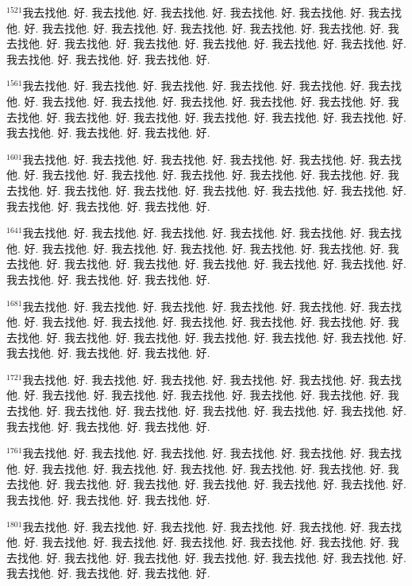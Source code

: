 \documentclass{book}
\begin{document}
$^{1521}$我去找他.
好.
我去找他.
好.
我去找他.
好.
我去找他.
好.
我去找他.
好.
我去找他.
好.
我去找他.
好.
我去找他.
好.
我去找他.
好.
我去找他.
好.
我去找他.
好.
我去找他.
好.
我去找他.
好.
我去找他.
好.
我去找他.
好.
我去找他.
好.
我去找他.
好.
我去找他.
好.
我去找他.
好.
我去找他.
好.

$^{1561}$我去找他.
好.
我去找他.
好.
我去找他.
好.
我去找他.
好.
我去找他.
好.
我去找他.
好.
我去找他.
好.
我去找他.
好.
我去找他.
好.
我去找他.
好.
我去找他.
好.
我去找他.
好.
我去找他.
好.
我去找他.
好.
我去找他.
好.
我去找他.
好.
我去找他.
好.
我去找他.
好.
我去找他.
好.
我去找他.
好.

$^{1601}$我去找他.
好.
我去找他.
好.
我去找他.
好.
我去找他.
好.
我去找他.
好.
我去找他.
好.
我去找他.
好.
我去找他.
好.
我去找他.
好.
我去找他.
好.
我去找他.
好.
我去找他.
好.
我去找他.
好.
我去找他.
好.
我去找他.
好.
我去找他.
好.
我去找他.
好.
我去找他.
好.
我去找他.
好.
我去找他.
好.

$^{1641}$我去找他.
好.
我去找他.
好.
我去找他.
好.
我去找他.
好.
我去找他.
好.
我去找他.
好.
我去找他.
好.
我去找他.
好.
我去找他.
好.
我去找他.
好.
我去找他.
好.
我去找他.
好.
我去找他.
好.
我去找他.
好.
我去找他.
好.
我去找他.
好.
我去找他.
好.
我去找他.
好.
我去找他.
好.
我去找他.
好.

$^{1681}$我去找他.
好.
我去找他.
好.
我去找他.
好.
我去找他.
好.
我去找他.
好.
我去找他.
好.
我去找他.
好.
我去找他.
好.
我去找他.
好.
我去找他.
好.
我去找他.
好.
我去找他.
好.
我去找他.
好.
我去找他.
好.
我去找他.
好.
我去找他.
好.
我去找他.
好.
我去找他.
好.
我去找他.
好.
我去找他.
好.

$^{1721}$我去找他.
好.
我去找他.
好.
我去找他.
好.
我去找他.
好.
我去找他.
好.
我去找他.
好.
我去找他.
好.
我去找他.
好.
我去找他.
好.
我去找他.
好.
我去找他.
好.
我去找他.
好.
我去找他.
好.
我去找他.
好.
我去找他.
好.
我去找他.
好.
我去找他.
好.
我去找他.
好.
我去找他.
好.
我去找他.
好.

$^{1761}$我去找他.
好.
我去找他.
好.
我去找他.
好.
我去找他.
好.
我去找他.
好.
我去找他.
好.
我去找他.
好.
我去找他.
好.
我去找他.
好.
我去找他.
好.
我去找他.
好.
我去找他.
好.
我去找他.
好.
我去找他.
好.
我去找他.
好.
我去找他.
好.
我去找他.
好.
我去找他.
好.
我去找他.
好.
我去找他.
好.

$^{1801}$我去找他.
好.
我去找他.
好.
我去找他.
好.
我去找他.
好.
我去找他.
好.
我去找他.
好.
我去找他.
好.
我去找他.
好.
我去找他.
好.
我去找他.
好.
我去找他.
好.
我去找他.
好.
我去找他.
好.
我去找他.
好.
我去找他.
好.
我去找他.
好.
我去找他.
好.
我去找他.
好.
我去找他.
好.
我去找他.
好.
\end{document}
